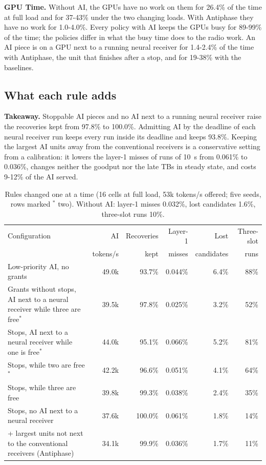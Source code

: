 \documentclass[acmsmall,screen,review,anonymous]{acmart}
\newcommand{\sys}{Antiphase\xspace}
\begin{document}
\noindent\textbf{GPU Time.} Without AI, the GPUs have no work on them for 26.4\% of the time at full load
and for 37-43\% under the two changing loads. With \sys they have no work for 1.0-4.0\%. Every policy
with AI keeps the GPUs busy for 89-99\% of the time; the policies differ in what the busy time does to the
radio work. An AI piece is on a GPU next to a running neural receiver for 1.4-2.4\% of the time with \sys,
the unit that finishes after a stop, and for 19-38\% with the baselines.

\subsection{What each rule adds}

\noindent\textbf{Takeaway.} Stoppable AI pieces and no AI next to a running neural receiver raise the
recoveries kept from 97.8\% to 100.0\%. Admitting AI by the deadline of each neural receiver run keeps every
run inside its deadline and keeps 93.8\%. Keeping the largest AI units away from the conventional receivers
is a conservative setting from a calibration: it lowers the layer-1 misses of runs of 10~s from 0.061\% to
0.036\%, changes neither the goodput nor the late TBs in steady state, and costs 9-12\% of the AI served.
\label{sec:rules}

\begin{table}[t]
\caption{Rules changed one at a time (16 cells at full load, 53k tokens/s offered; five seeds, rows marked
$^{*}$ two). Without AI: layer-1 misses 0.032\%, lost candidates 1.6\%, three-slot runs 10\%.}
\label{tab:rules}
\footnotesize
\begin{tabularx}{\linewidth}{@{}>{\raggedright\arraybackslash}Xrrrrr@{}}
\toprule
Configuration & AI & Recoveries & Layer-1 & Lost & Three-slot \\
 & tokens/s & kept & misses & candidates & runs \\
\midrule
Low-priority AI, no grants & 49.0k & 93.7\% & 0.044\% & 6.4\% & 88\% \\
Grants without stops, AI next to a neural receiver while three are free$^{*}$ & 39.5k & 97.8\% & 0.025\% & 3.2\% & 52\% \\
Stops, AI next to a neural receiver while one is free$^{*}$ & 44.0k & 95.1\% & 0.066\% & 5.2\% & 81\% \\
Stops, while two are free$^{*}$ & 42.2k & 96.6\% & 0.051\% & 4.1\% & 64\% \\
Stops, while three are free & 39.8k & 99.3\% & 0.038\% & 2.4\% & 35\% \\
Stops, no AI next to a neural receiver & 37.6k & 100.0\% & 0.061\% & 1.8\% & 14\% \\
+ largest units not next to the conventional receivers (\sys) & 34.1k & 99.9\% & 0.036\% & 1.7\% & 11\% \\
\bottomrule
\end{tabularx}
\end{table}
\end{document}
